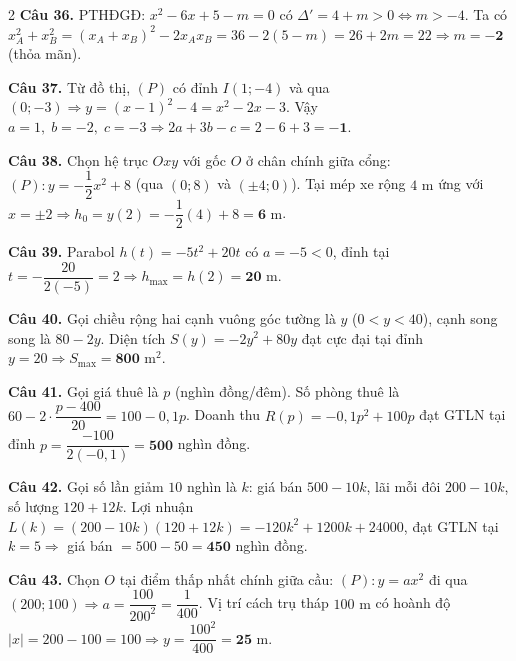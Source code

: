 \documentclass[12pt,a4paper]{article}
\begin{document}
\begin{multicols}{2}
\textbf{Câu 36.} PTHĐGĐ: $x^2 - 6x + 5 - m = 0$ có $\Delta' = 4 + m > 0 \Leftrightarrow m > -4$. Ta có $x_A^2 + x_B^2 = (x_A + x_B)^2 - 2x_Ax_B = 36 - 2(5 - m) = 26 + 2m = 22 \Rightarrow m = \mathbf{-2}$ (thỏa mãn).\par\vspace{3pt}

\textbf{Câu 37.} Từ đồ thị, $(P)$ có đỉnh $I(1; -4)$ và qua $(0; -3) \Rightarrow y = (x-1)^2 - 4 = x^2 - 2x - 3$. Vậy $a = 1,\; b = -2,\; c = -3 \Rightarrow 2a + 3b - c = 2 - 6 + 3 = \mathbf{-1}$.\par\vspace{3pt}

\textbf{Câu 38.} Chọn hệ trục $Oxy$ với gốc $O$ ở chân chính giữa cổng: $(P): y = -\dfrac{1}{2}x^2 + 8$ (qua $(0;8)$ và $(\pm 4; 0)$). Tại mép xe rộng $4\text{ m}$ ứng với $x = \pm 2 \Rightarrow h_0 = y(2) = -\dfrac{1}{2}(4) + 8 = \mathbf{6}\text{ m}$.\par\vspace{3pt}

\textbf{Câu 39.} Parabol $h(t) = -5t^2 + 20t$ có $a = -5 < 0$, đỉnh tại $t = -\dfrac{20}{2(-5)} = 2 \Rightarrow h_{\max} = h(2) = \mathbf{20}\text{ m}$.\par\vspace{3pt}

\textbf{Câu 40.} Gọi chiều rộng hai cạnh vuông góc tường là $y$ ($0 < y < 40$), cạnh song song là $80 - 2y$. Diện tích $S(y) = -2y^2 + 80y$ đạt cực đại tại đỉnh $y = 20 \Rightarrow S_{\max} = \mathbf{800}\text{ m}^2$.\par\vspace{3pt}

\textbf{Câu 41.} Gọi giá thuê là $p$ (nghìn đồng/đêm). Số phòng thuê là $60 - 2\cdot \dfrac{p - 400}{20} = 100 - 0{,}1p$. Doanh thu $R(p) = -0{,}1p^2 + 100p$ đạt GTLN tại đỉnh $p = \dfrac{-100}{2(-0{,}1)} = \mathbf{500}$ nghìn đồng.\par\vspace{3pt}

\textbf{Câu 42.} Gọi số lần giảm $10$ nghìn là $k$: giá bán $500 - 10k$, lãi mỗi đôi $200 - 10k$, số lượng $120 + 12k$. Lợi nhuận $L(k) = (200 - 10k)(120 + 12k) = -120k^2 + 1200k + 24000$, đạt GTLN tại $k = 5 \Rightarrow$ giá bán $= 500 - 50 = \mathbf{450}$ nghìn đồng.\par\vspace{3pt}

\textbf{Câu 43.} Chọn $O$ tại điểm thấp nhất chính giữa cầu: $(P): y = ax^2$ đi qua $(200; 100) \Rightarrow a = \dfrac{100}{200^2} = \dfrac{1}{400}$. Vị trí cách trụ tháp $100\text{ m}$ có hoành độ $|x| = 200 - 100 = 100 \Rightarrow y = \dfrac{100^2}{400} = \mathbf{25}\text{ m}$.\par\vspace{3pt}


\end{multicols}
\end{document}

